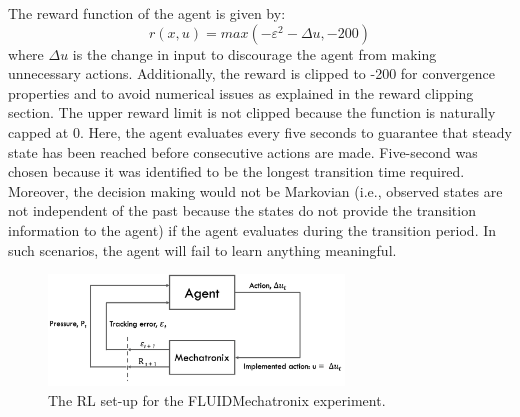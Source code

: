 The reward function of the agent is given by:
\begin{equation}
    r(x, u) = max(-\varepsilon^2 - \Delta u, -200)
\end{equation}
where $\Delta u$ is the change in input to discourage the agent from making unnecessary actions. Additionally, the reward is clipped to -200 for convergence properties and to avoid numerical issues as explained in the reward clipping section. The upper reward limit is not clipped because the function is naturally capped at 0. Here, the agent evaluates every five seconds to guarantee that steady state has been reached before consecutive actions are made. Five-second was chosen because it was identified to be the longest transition time required. Moreover, the decision making would not be Markovian (i.e., observed states are not independent of the past because the states do not provide the transition information to the agent) if the agent evaluates during the transition period. In such scenarios, the agent will fail to learn anything meaningful. 

\begin{figure}[H]
    \centering
    \includegraphics[width=0.7\textwidth]{images/ch4/rl_system1}
    \caption{The RL set-up for the FLUIDMechatronix experiment.}
    \label{fig:04rl_system1}
\end{figure}

